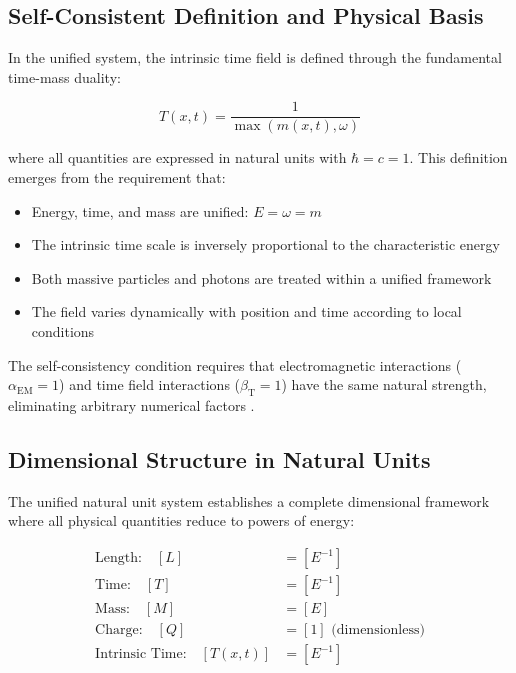 \documentclass[12pt,a4paper]{article}
\newcommand{\Tfieldt}{T(x,t)}
\newcommand{\alphaEM}{\alpha_{\text{EM}}}
\newcommand{\betaT}{\beta_{\text{T}}}
\begin{document}
	\subsection{Self-Consistent Definition and Physical Basis}
	\label{subsec:self_consistent_definition}
	
	In the unified system, the intrinsic time field is defined through the fundamental time-mass duality:
	
	\begin{equation}
		\Tfieldt = \frac{1}{\max(m(x,t), \omega)}
	\end{equation}
	
	where all quantities are expressed in natural units with $\hbar = c = 1$. This definition emerges from the requirement that:
	
	\begin{itemize}
		\item Energy, time, and mass are unified: $E = \omega = m$
		\item The intrinsic time scale is inversely proportional to the characteristic energy
		\item Both massive particles and photons are treated within a unified framework
		\item The field varies dynamically with position and time according to local conditions
	\end{itemize}
	
	The self-consistency condition requires that electromagnetic interactions ($\alphaEM = 1$) and time field interactions ($\betaT = 1$) have the same natural strength, eliminating arbitrary numerical factors \cite{pascher_beta_derivation_2025}.
	
	\subsection{Dimensional Structure in Natural Units}
	\label{subsec:dimensional_structure}
	
	The unified natural unit system establishes a complete dimensional framework where all physical quantities reduce to powers of energy:
	
	\begin{tcolorbox}[colback=blue!5!white,colframe=blue!75!black,title=Unified Natural Units Dimensional Structure]
		\begin{align}
			\text{Length:} \quad [L] &= [E^{-1}] \nonumber\\
			\text{Time:} \quad [T] &= [E^{-1}] \nonumber\\
			\text{Mass:} \quad [M] &= [E] \nonumber\\
			\text{Charge:} \quad [Q] &= [1] \text{ (dimensionless)} \nonumber\\
			\text{Intrinsic Time:} \quad [\Tfieldt] &= [E^{-1}] \nonumber
		\end{align}
	\end{tcolorbox}
	
\end{document}
